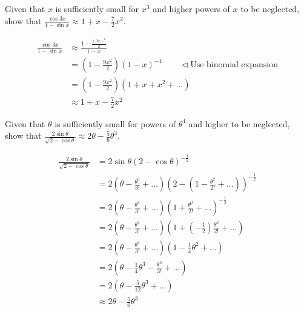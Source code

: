 \documentclass[11pt,a4paper]{book}
\begin{document}
\begin{example}

Given that $x$ is sufficiently small for $x^{3}$ and higher powers
of $x$ to be neglected, show that ${\displaystyle \frac{\cos3x}{1-\sin x}\approx1+x-\frac{7}{2}x^{2}}$.

\medskip

\Solution

\begin{align*}
\frac{\cos3x}{1-\sin x} & \approx\frac{1-\frac{\left(3x\right)^{2}}{2}}{1-x}\\
 & =\left(1-\frac{9x^{2}}{2}\right)\left(1-x\right)^{-1}\qquad\triangleleft\text{Use binomial expansion}\\
 & =\left(1-\frac{9x^{2}}{2}\right)\left(1+x+x^{2}+\ldots\right)\\
 & \approx1+x-\frac{7}{2}x^{2}
\end{align*}

\end{example}

\begin{example}

Given that $\theta$ is sufficiently small for powers of $\theta^{4}$
and higher to be neglected, show that ${\displaystyle \frac{2\sin\theta}{\sqrt{2-\cos\theta}}\approx2\theta-\frac{5}{6}\theta^{3}}$.

\medskip

\Solution

\begin{align*}
{\displaystyle \frac{2\sin\theta}{\sqrt{2-\cos\theta}}} & =2\sin\theta\left(2-\cos\theta\right)^{-\frac{1}{2}}\\
 & =2\left(\theta-\frac{\theta^{3}}{3!}+\ldots\right)\left(2-\left(1-\frac{\theta^{2}}{2!}+\ldots\right)\right)^{-\frac{1}{2}}\\
 & =2\left(\theta-\frac{\theta^{3}}{3!}+\ldots\right)\left(1+\frac{\theta^{2}}{2!}+\ldots\right)^{-\frac{1}{2}}\\
 & =2\left(\theta-\frac{\theta^{3}}{3!}+\ldots\right)\left(1+\left(-\frac{1}{2}\right)\frac{\theta^{2}}{2!}+...\right)\\
 & =2\left(\theta-\frac{\theta^{3}}{3!}+\ldots\right)\left(1-\frac{1}{4}\theta^{2}+...\right)\\
 & =2\left(\theta-\frac{1}{4}\theta^{3}-\frac{\theta^{3}}{3!}+\ldots\right)\\
 & =2\left(\theta-\frac{5}{12}\theta^{3}+\ldots\right)\\
 & \approx2\theta-\frac{5}{6}\theta^{3}
\end{align*}

\end{example}
\end{document}
